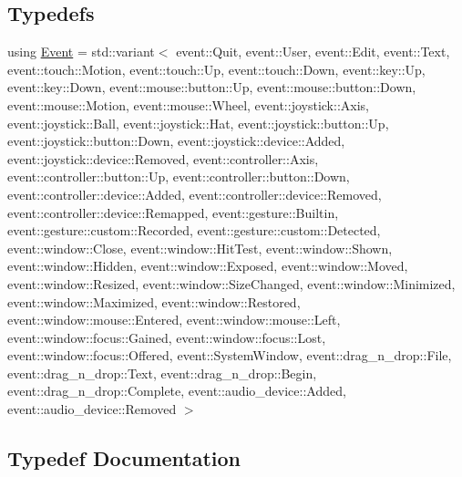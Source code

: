 \subsection*{Typedefs}
\begin{DoxyCompactItemize}
\item 
using \mbox{\hyperlink{namespacerolmodl_1_1button__state_aef4672e4b037d3f04e71d731caf34aa9}{Event}} = std\+::variant$<$ event\+::\+Quit, event\+::\+User, event\+::\+Edit, event\+::\+Text, event\+::touch\+::\+Motion, event\+::touch\+::\+Up, event\+::touch\+::\+Down, event\+::key\+::\+Up, event\+::key\+::\+Down, event\+::mouse\+::button\+::\+Up, event\+::mouse\+::button\+::\+Down, event\+::mouse\+::\+Motion, event\+::mouse\+::\+Wheel, event\+::joystick\+::\+Axis, event\+::joystick\+::\+Ball, event\+::joystick\+::\+Hat, event\+::joystick\+::button\+::\+Up, event\+::joystick\+::button\+::\+Down, event\+::joystick\+::device\+::\+Added, event\+::joystick\+::device\+::\+Removed, event\+::controller\+::\+Axis, event\+::controller\+::button\+::\+Up, event\+::controller\+::button\+::\+Down, event\+::controller\+::device\+::\+Added, event\+::controller\+::device\+::\+Removed, event\+::controller\+::device\+::\+Remapped, event\+::gesture\+::\+Builtin, event\+::gesture\+::custom\+::\+Recorded, event\+::gesture\+::custom\+::\+Detected, event\+::window\+::\+Close, event\+::window\+::\+Hit\+Test, event\+::window\+::\+Shown, event\+::window\+::\+Hidden, event\+::window\+::\+Exposed, event\+::window\+::\+Moved, event\+::window\+::\+Resized, event\+::window\+::\+Size\+Changed, event\+::window\+::\+Minimized, event\+::window\+::\+Maximized, event\+::window\+::\+Restored, event\+::window\+::mouse\+::\+Entered, event\+::window\+::mouse\+::\+Left, event\+::window\+::focus\+::\+Gained, event\+::window\+::focus\+::\+Lost, event\+::window\+::focus\+::\+Offered, event\+::\+System\+Window, event\+::drag\+\_\+n\+\_\+drop\+::\+File, event\+::drag\+\_\+n\+\_\+drop\+::\+Text, event\+::drag\+\_\+n\+\_\+drop\+::\+Begin, event\+::drag\+\_\+n\+\_\+drop\+::\+Complete, event\+::audio\+\_\+device\+::\+Added, event\+::audio\+\_\+device\+::\+Removed $>$
\end{DoxyCompactItemize}


\subsection{Typedef Documentation}
\mbox{\label{namespacerolmodl_1_1button__state_aef4672e4b037d3f04e71d731caf34aa9}} 
